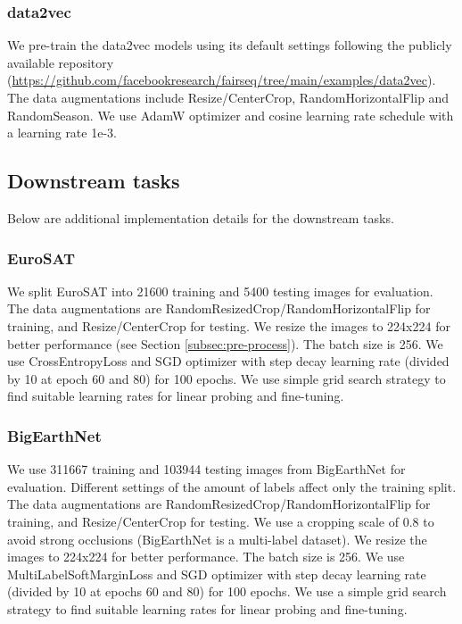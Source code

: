 \documentclass[lettersize,journal]{IEEEtran}
\begin{document}
\vspace{0.3em}
\subsubsection{data2vec}
We pre-train the data2vec models using its default settings following the publicly available repository (\url{https://github.com/facebookresearch/fairseq/tree/main/examples/data2vec}). The data augmentations include Resize/CenterCrop, RandomHorizontalFlip and RandomSeason. We use AdamW optimizer and cosine learning rate schedule with a learning rate 1e-3.


\subsection{\textbf{Downstream tasks}} Below are additional implementation details for the downstream tasks.

\vspace{0.5em}
\subsubsection{EuroSAT}
We split EuroSAT into 21600 training and 5400 testing images for evaluation. The data augmentations are RandomResizedCrop/RandomHorizontalFlip for training, and Resize/CenterCrop for testing. We resize the images to 224x224 for better performance (see Section \ref{subsec:pre-process}). The batch size is 256. We use CrossEntropyLoss and SGD optimizer with step decay learning rate (divided by 10 at epoch 60 and 80) for 100 epochs. We use simple grid search strategy to find suitable learning rates for linear probing and fine-tuning.

\vspace{0.3em}
\subsubsection{BigEarthNet}
We use 311667 training and 103944 testing images from BigEarthNet for evaluation. Different settings of the amount of labels affect only the training split. The data augmentations are RandomResizedCrop/RandomHorizontalFlip for training, and Resize/CenterCrop for testing. We use a cropping scale of 0.8 to avoid strong occlusions (BigEarthNet is a multi-label dataset). We resize the images to 224x224 for better performance. The batch size is 256. We use MultiLabelSoftMarginLoss and SGD optimizer with step decay learning rate (divided by 10 at epochs 60 and 80) for 100 epochs. We use a simple grid search strategy to find suitable learning rates for linear probing and fine-tuning.
\end{document}
